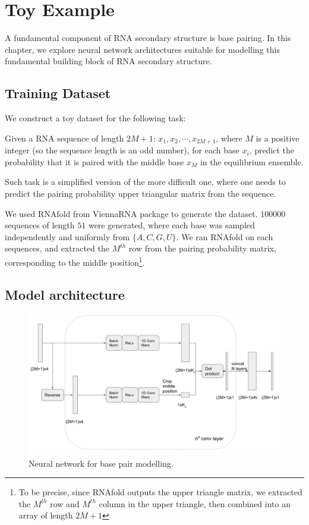 \documentclass{proposal}
\begin{document}
\chapter{Toy Example}

A fundamental component of RNA secondary structure is base pairing.
In this chapter, we explore neural network architectures suitable for modelling this fundamental
building block of RNA secondary structure.

\section{Training Dataset}

We construct a toy dataset for the following task:

Given a RNA sequence of length $2M + 1$: $x_1, x_2, \cdots, x_{2M+1}$,
where $M$ is a positive integer (so the sequence length is an odd number),
for each base $x_i$, predict the probability that it is
paired with the middle base $x_M$ in the equilibrium ensemble.

Such task is a simplified version of the more difficult one,
where one needs to predict the pairing probability upper triangular matrix from the sequence.

We used RNAfold from ViennaRNA package\cite{lorenz2011viennarna} to generate the dataset.
$100000$ sequences of length $51$ were generated,
where each base was sampled independently and uniformly from $\{A, C, G, U\}$.
We ran RNAfold on each sequences, and extracted the $M^{th}$ row from the pairing probability
matrix, corresponding to the middle
position\footnote{To be precise, since RNAfold outputs the upper triangle matrix,
we extracted the $M^{th}$ row and $M^{th}$ column in the upper triangle, then combined into an array of length $2M+1$}.

\section{Model architecture}

\begin{figure}
    \centering
    \includegraphics[width=\textwidth]{plot/pair_prob_nn_plot.png}
    \caption{Neural network for base pair modelling.}
    \label{fig:base_pair_nn}
    \centering
\end{figure}
\end{document}

